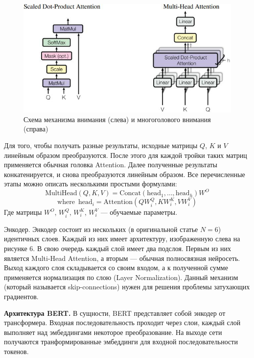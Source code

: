 \documentclass[12pt,a4paper]{article}
\begin{document}
\begin{figure}[H]
	\begin{center}
		\includegraphics[scale=0.65]{mh2.jpg}
	\end{center}
	\caption{Схема механизма внимания (слева) и многоголового внимания (справа) \cite{transformer}}
\end{figure}

\noindent Для того, чтобы получать разные результаты, исходные матрицы $Q$, $K$ и $V$ линейным образом преобразуются. После этого для каждой тройки таких матриц применяется обычная головка Attention. Далее полученные результаты конкатенируется, и снова преобразуются линейным образом. Все перечисленные этапы можно описать несколькими простыми формулами:
$$\mathrm{MultiHead} (Q, K, V) = \mathrm{Concat}(\mathrm{head}_1, \dots, \mathrm{head}_h) W^O$$
$$\mathrm{where} \enspace \mathrm{head}_i = \mathrm{Attention}(QW_i^Q, KW_i^K, VW_i^V)$$
\noindent Где матрицы $W^O$, $W_i^Q$, $W_i^K$, $W_i^V$ --- обучаемые параметры.

Энкодер. Энкодер состоит из нескольких (в оригинальной статье $N = 6$) идентичных слоев. Каждый из них имеет архитектуру, изображенную слева на рисунке 6. В свою очередь каждый слой имеет два подслоя. Первым из них является Multi-Head Attention, а вторым --- обычная полносвязная нейросеть. Выход каждого слоя складывается со своим входом, а к полученной сумме применяется нормализация по слою (Layer Normalization). Данный механизм (который называется skip-connections) нужен для решения проблемы затухающих градиентов. 


\textbf{Архитектура BERT.} В сущности, BERT\cite{bert} представляет собой энкодер от трансформера. Входная последовательность проходит через слои, каждый слой выполняет над эмбеддингами некоторое преобразование. На выходе сети получаются транформированные эмбеддинги для входной последовательности токенов.
\end{document}

